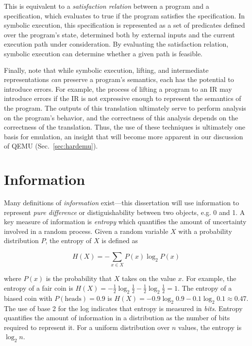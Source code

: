 This is equivalent to a \emph{satisfaction relation} between a program and a specification, which evaluates to true if the program satisfies the specification.
In symbolic execution, this specification is represented as a set of predicates defined over the program's state, determined both by external inputs and the current execution path under consideration.
By evaluating the satisfaction relation, symbolic execution can determine whether a given path is feasible.

Finally, note that while symbolic execution, lifting, and intermediate representations \emph{can} preserve a program's semantics, each has the potential to introduce errors.
For example, the process of lifting a program to an IR may introduce errors if the IR is not expressive enough to represent the semantics of the program.
The outputs of this translation ultimately serve to perform analysis on the program's behavior, and the correctness of this analysis depends on the correctness of the translation.
Thus, the use of these techniques is ultimately one basis for emulation, an insight that will become more apparent in our discussion of QEMU (Sec.~\ref{sec:hardemu}).

\section{Information}

Many definitions of \emph{information} exist---this dissertation will use information to represent \emph{pure difference} or distiguishability between two objects, e.g. 0 and 1.
A key measure of information is \emph{entropy} which quantifies the amount of uncertainty involved in a random process.
Given a random variable $X$ with a probability distribution $P$, the entropy of $X$ is defined as

\begin{equation}
H(X) = -\sum_{x \in X} P(x) \log_2 P(x)
\end{equation}

\noindent
where $P(x)$ is the probability that $X$ takes on the value $x$.
For example, the entropy of a fair coin is $H(X) = -\frac{1}{2} \log_2 \frac{1}{2} - \frac{1}{2} \log_2 \frac{1}{2} = 1$.
The entropy of a biased coin with $P(\text{heads}) = 0.9$ is $H(X) = -0.9 \log_2 0.9 - 0.1 \log_2 0.1 \approx 0.47$.
The use of base 2 for the log indicates that entropy is measured in \emph{bits}.
Entropy quantifies the amount of information in a distribution as the number of bits required to represent it.
For a uniform distribution over $n$ values, the entropy is $\log_2 n$.

